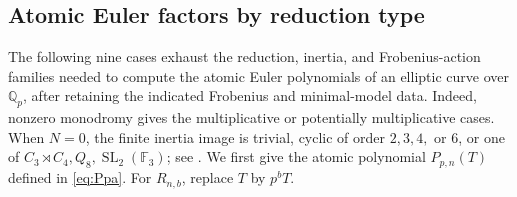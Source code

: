 \documentclass[11pt,reqno]{amsart}
\theoremstyle{definition}
\theoremstyle{remark}
\newcommand{\Q}{\mathbb Q}
\newcommand{\SL}{\operatorname{SL}}
\begin{document}
\subsection{Atomic Euler factors by reduction type}

The following nine cases exhaust the reduction, inertia, and Frobenius-action
families needed to compute the atomic Euler polynomials of an elliptic curve
over $\Q_p$, after retaining the indicated Frobenius and minimal-model data.
Indeed, nonzero monodromy gives the multiplicative or
potentially multiplicative cases.  When $N=0$, the finite inertia image is
trivial, cyclic of order $2,3,4,$ or $6$, or one of
$C_3\rtimes C_4,Q_8,\SL_2(\mathbb F_3)$; see
\cite[Section~4]{DMW}.  We first give the atomic polynomial $P_{p,n}(T)$ defined in
\eqref{eq:Ppa}.  For $R_{n,b}$, replace $T$ by $p^bT$.
\end{document}
